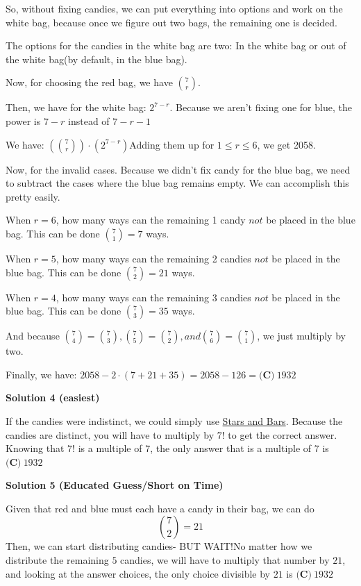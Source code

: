 \begin{enumerate}
 So, without fixing candies, we can put everything into options and work on the white bag, because once we figure out two bags, the remaining one is decided. 

 The options for the candies in the white bag are two: In the white bag or out of the white bag(by default, in the blue bag).

 Now, for choosing the red bag, we have ${7 \choose r}$.

 Then, we have for the white bag: $2^{7-r}$. Because we aren't fixing one for blue, the power is $7-r$ instead of $7-r-1$

 We have: $({7 \choose r}) \cdot (2^{7-r})$Adding them up for ${1 \leq r \leq 6}$, we get 2058.

 Now, for the invalid cases. Because we didn't fix candy for the blue bag, we need to subtract the cases where the blue bag remains empty. We can accomplish this pretty easily.

 When $r = 6$, how many ways can the remaining 1 candy $not$ be placed in the blue bag. This can be done ${7 \choose 1} = 7$ ways.

 When $r = 5$, how many ways can the remaining 2 candies $not$ be placed in the blue bag. This can be done ${7 \choose 2} = 21$ ways.

 When $r = 4$, how many ways can the remaining 3 candies $not$ be placed in the blue bag. This can be done ${7 \choose 3} = 35$ ways.

 And because ${7 \choose 4} = {7 \choose 3}, {7 \choose 5} = {7 \choose 2}, and {7 \choose 6} = {7 \choose 1}$, we just multiply by two. 

 Finally, we have: $2058 - 2 \cdot (7+21+35) = 2058 - 126 = \boxed{\textbf{(C)}\ 1932}$




\textbf{Solution 4 (easiest)}

If the candies were indistinct, we could simply use \href{https://artofproblemsolving.com/wiki/index.php?title=Ball-and-urn}{Stars and Bars}. Because the candies are distinct, you will have to multiply by $7!$ to get the correct answer. Knowing that $7!$ is a multiple of $7$, the only answer that is a multiple of 7 is $\boxed{\textbf{(C)}\ 1932}$




\textbf{Solution 5 (Educated Guess/Short on Time)}

Given that red and blue must each have a candy in their bag, we can do 
 \[\binom{7}{2} = 21\]Then, we can start distributing candies- BUT WAIT!No matter how we distribute the remaining $5$ candies, we will have to multiply that number by $21$, and looking at the answer choices, the only choice divisible by $21$ is $\boxed{\textbf{(C)}\ 1932}$




\end{enumerate}
